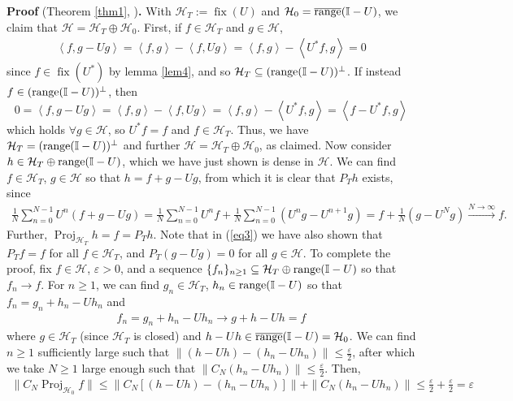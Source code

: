 \documentclass[11pt]{report}
\newcommand{\mc}[1]{\mathcal{#1}}
\newcommand{\ip}[2]{\left\langle#1,#2\right\rangle }
\newcommand{\1}[1]{\mathbbm{1}_{\{#1\}}}
\DeclareMathOperator{\fix}{fix}
\DeclareMathOperator{\ran}{range}
\DeclareMathOperator{\proj}{Proj}
\theoremstyle{definition}
\begin{document}
    \noindent\textbf{Proof} (Theorem \ref{thm1}, \cite[theorem 1.3.1]{Weber_2000})\textbf{.} With
    $\mc{H}_T:=\fix(U)$ and $\mc{H}_0=\overline{\ran}(\mbb{I}-U)$, we claim that
    $\mc{H}=\mc{H}_T\oplus\mc{H}_0$. First, if $f\in\mc{H}_T$ and $g\in\mc{H}$,
    \begin{align*}
        \ip{f}{g-Ug}=\ip{f}{g}-\ip{f}{Ug}=\ip{f}{g}-\ip{U^\ast f}{g}=0
    \end{align*}
    since $f\in\fix(U^\ast)$ by lemma \ref{lem4}, and so
    $\mc{H}_T\subseteq(\ran(\mbb{I}-U))^\perp$. If instead
    $f\in(\ran(\mbb{I}-U))^\perp$, then
    \[0=\ip{f}{g-Ug}=\ip{f}{g}-\ip{f}{Ug}=\ip{f}{g}-\ip{U^\ast
    f}{g}=\ip{f-U^\ast f}{g}\] which holds $\forall g\in\mc{H}$, so $U^\ast f=f$
    and $f\in\mc{H}_T$. Thus, we have $\mc{H}_T=(\ran(\mbb{I}-U))^\perp$ and
    further $\mc{H}=\mc{H}_T\oplus\mc{H}_0$, as claimed. Now consider
    $h\in\mc{H}_T\oplus \ran(\mbb{I}-U)$, which we have just shown is dense in
    $\mc{H}$. We can find $f\in\mc{H}_T$, $g\in\mc{H}$ so that $h=f+g-Ug$, from
    which it is clear that $P_Th$ exists, since
    \begin{align}
        \frac{1}{N}\sum_{n=0}^{N-1}U^n(f+g-Ug)=\frac{1}{N}\sum_{n=0}^{N-1}U^nf+\frac{1}{N}\sum_{n=0}^{N-1}(U^ng-U^{n+1}g)=f+\frac{1}{N}(g-U^Ng)\overset{N\rightarrow\infty}{\longrightarrow} f.\label{eq3}
    \end{align}
    Further, $\proj_{\mc{H}_T}h=f=P_Th$. Note that in (\ref{eq3}) we have also
    shown that $P_Tf=f$ for all $f\in\mc{H}_T$, and $P_T(g-Ug)=0$ for
    all $g\in\mc{H}$. To complete the proof, fix $f\in\mc{H}$, $\varepsilon>0$,
    and a sequence $\{f_n\}_{n\geq 1}\subseteq\mc{H}_T\oplus\ran(\mbb{I}-U)$ so
    that $f_n\rightarrow f$. For $n\geq 1$, we can find $g_n\in\mc{H}_T$,
    $h_n\in\ran(\mbb{I}-U)$ so that $f_n=g_n+h_n-Uh_n$ and 
    \begin{align*}
        f_n=g_n+h_n-Uh_n\longrightarrow g+h-Uh=f
    \end{align*}
    where $g\in\mc{H}_T$ (since $\mc{H}_T$ is closed) and
    $h-Uh\in\overline{\ran}(\mbb{I}-U)=\mc{H}_0$. We can find $n\geq 1$
    sufficiently large such that
    $\|(h-Uh)-(h_n-Uh_n)\|\leq\frac{\varepsilon}{2}$, after which we take $N\geq
    1$ large enough such that $\|C_N(h_n-Uh_n)\|\leq\frac{\varepsilon}{2}$.
    Then,
    \begin{align*}
        \|C_N\proj_{\mc{H}_0}f\|\leq\|C_N[(h-Uh)-(h_n-Uh_n)]\|+\|C_N(h_n-Uh_n)\|\leq\frac{\varepsilon}{2}+\frac{\varepsilon}{2}=\varepsilon
    \end{align*}
\end{document}
